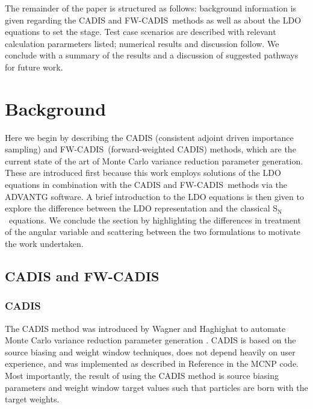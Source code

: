 \documentclass{article} %
\newcommand{\sn}{S$_\mathrm{N}$}
\newcommand{\fwc}{\mbox{FW-CADIS}}
\begin{document}
The remainder of the paper is structured as follows: background information is
given regarding the CADIS and \fwc\ methods as well as about the LDO equations
to set the stage. Test case scenarios are described with relevant calculation
pararmeters listed; numerical results and discussion follow. We conclude with a
summary of the results and a discussion of suggested pathways for future work.

\section{Background}
\label{sec:background}

Here we begin by describing the CADIS (consistent adjoint driven importance 
sampling) and \fwc\ (forward-weighted CADIS) methods, which are the current
state of the art of Monte Carlo variance reduction parameter generation. These
are introduced first because this work employs solutions of the LDO equations
in combination with the CADIS and \fwc\ methods via the ADVANTG \cite{advantg}
software. A brief introduction to the LDO equations is then given to explore
the difference between the LDO representation and the classical \sn\ equations.
We conclude the section by highlighting the differences in treatment of the
angular variable and scattering between the two formulations to motivate the
work undertaken.

\subsection{CADIS and \fwc}

\subsubsection{CADIS}

The CADIS method was introduced by Wagner and Haghighat to automate Monte Carlo
variance reduction parameter generation \cite{cadis}. CADIS is based on the
source biasing and weight window techniques, does not depend heavily 
on user experience, and was implemented as described in Reference \cite{cadis}
in the MCNP \cite{mcnp} code. Most importantly, the result of using the CADIS
method is source biasing parameters and weight window target
values such that particles are born with the target weights.
\end{document}
